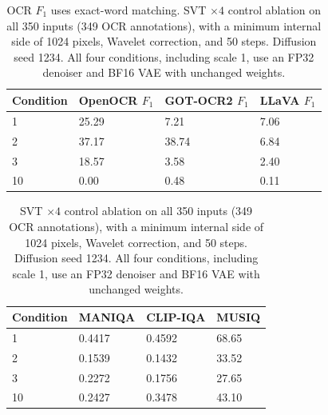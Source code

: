 \begin{table}[H]
\centering
\caption{OCR $F_1$ uses exact-word matching. SVT $\times4$ control ablation on all 350 inputs (349 OCR annotations), with a minimum internal side of 1024 pixels, Wavelet correction, and 50 steps. Diffusion seed 1234. All four conditions, including scale 1, use an FP32 denoiser and BF16 VAE with unchanged weights.}
\label{tab:ar-svt-control-ocr}
\small
\setlength{\tabcolsep}{4pt}
\begin{tabular}{llll}
\toprule
Condition & OpenOCR $F_1$ & GOT-OCR2 $F_1$ & LLaVA $F_1$ \\
\midrule
1 & 25.29 & 7.21 & 7.06 \\
2 & 37.17 & 38.74 & 6.84 \\
3 & 18.57 & 3.58 & 2.40 \\
10 & 0.00 & 0.48 & 0.11 \\
\bottomrule
\end{tabular}
\end{table}

\begin{table}[H]
\centering
\caption{SVT $\times4$ control ablation on all 350 inputs (349 OCR annotations), with a minimum internal side of 1024 pixels, Wavelet correction, and 50 steps. Diffusion seed 1234. All four conditions, including scale 1, use an FP32 denoiser and BF16 VAE with unchanged weights.}
\label{tab:ar-svt-control-iqa}
\small
\setlength{\tabcolsep}{4pt}
\begin{tabular}{llll}
\toprule
Condition & MANIQA & CLIP-IQA & MUSIQ \\
\midrule
1 & 0.4417 & 0.4592 & 68.65 \\
2 & 0.1539 & 0.1432 & 33.52 \\
3 & 0.2272 & 0.1756 & 27.65 \\
10 & 0.2427 & 0.3478 & 43.10 \\
\bottomrule
\end{tabular}
\end{table}
